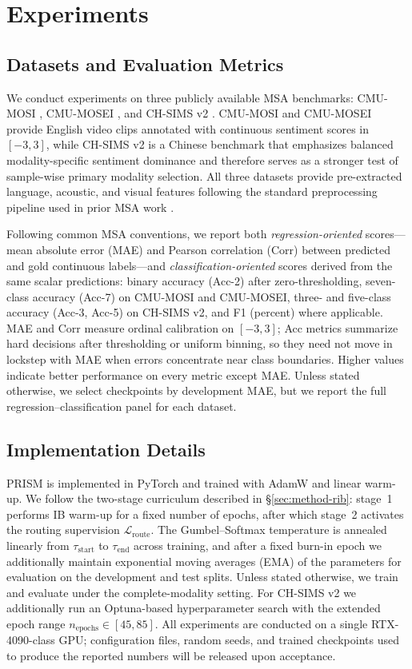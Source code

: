 \section{Experiments}
\label{sec:experiments}

\subsection{Datasets and Evaluation Metrics}
\label{sec:res-data}
We conduct experiments on three publicly available MSA benchmarks:
CMU-MOSI \citep{zadeh2017tensor}, CMU-MOSEI \citep{zadeh2018multi}, and
CH-SIMS v2 \citep{yu2021simsv2}.
CMU-MOSI and CMU-MOSEI provide English video clips annotated with continuous
sentiment scores in $[-3, 3]$, while CH-SIMS v2 is a Chinese benchmark that
emphasizes balanced modality-specific sentiment dominance and therefore serves
as a stronger test of sample-wise primary modality selection.
All three datasets provide pre-extracted language, acoustic, and visual
features following the standard preprocessing pipeline used in prior MSA
work \citep{mods2026align,yu2021selfmm}.

Following common MSA conventions, we report both \emph{regression-oriented}
scores---mean absolute error (MAE) and Pearson correlation (Corr) between
predicted and gold continuous labels---and \emph{classification-oriented}
scores derived from the same scalar predictions: binary accuracy (Acc-2)
after zero-thresholding, seven-class accuracy (Acc-7) on CMU-MOSI and
CMU-MOSEI, three- and five-class accuracy (Acc-3, Acc-5) on CH-SIMS v2, and
F1 (percent) where applicable.
MAE and Corr measure ordinal calibration on $[-3,3]$; Acc metrics summarize
hard decisions after thresholding or uniform binning, so they need not move
in lockstep with MAE when errors concentrate near class boundaries.
Higher values indicate better performance on every metric except MAE.
Unless stated otherwise, we select checkpoints by development MAE, but we
report the full regression--classification panel for each dataset.

\subsection{Implementation Details}
\label{sec:res-impl}
PRISM is implemented in PyTorch and trained with AdamW and linear warm-up.
We follow the two-stage curriculum described in \S\ref{sec:method-rib}:
stage~1 performs IB warm-up for a fixed number of epochs, after which stage~2
activates the routing supervision $\mathcal{L}_{\mathrm{route}}$.
The Gumbel--Softmax temperature is annealed linearly from
$\tau_{\mathrm{start}}$ to $\tau_{\mathrm{end}}$ across training, and after a
fixed burn-in epoch we additionally maintain exponential moving averages (EMA)
of the parameters for evaluation on the development and test splits.
Unless stated otherwise, we train and evaluate under the complete-modality
setting. For CH-SIMS v2 we additionally run an Optuna-based hyperparameter
search with the extended epoch range $n_{\mathrm{epochs}} \in [45, 85]$.
All experiments are conducted on a single RTX-4090-class GPU;
configuration files, random seeds, and trained checkpoints used to produce
the reported numbers will be released upon acceptance.

